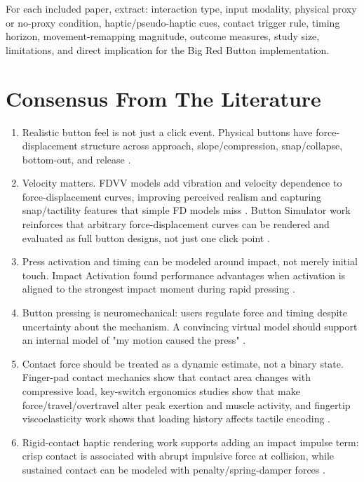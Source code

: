 \documentclass[11pt]{article}
\begin{document}
For each included paper, extract: interaction type, input modality, physical proxy or no-proxy condition, haptic/pseudo-haptic cues, contact trigger rule, timing horizon, movement-remapping magnitude, outcome measures, study size, limitations, and direct implication for the Big Red Button implementation.

\section{Consensus From The Literature}
\begin{enumerate}
  \item Realistic button feel is not just a click event. Physical buttons have force-displacement structure across approach, slope/compression, snap/collapse, bottom-out, and release \cite{kim2013virtualbutton,liao2020fdvv}.
  \item Velocity matters. FDVV models add vibration and velocity dependence to force-displacement curves, improving perceived realism and capturing snap/tactility features that simple FD models miss \cite{liao2020fdvv,liao2020pressem}. Button Simulator work reinforces that arbitrary force-displacement curves can be rendered and evaluated as full button designs, not just one click point \cite{liao2018buttonsim}.
  \item Press activation and timing can be modeled around impact, not merely initial touch. Impact Activation found performance advantages when activation is aligned to the strongest impact moment during rapid pressing \cite{kim2018impact}.
  \item Button pressing is neuromechanical: users regulate force and timing despite uncertainty about the mechanism. A convincing virtual model should support an internal model of "my motion caused the press" \cite{oulasvirta2018neuromechanics}.
  \item Contact force should be treated as a dynamic estimate, not a binary state. Finger-pad contact mechanics show that contact area changes with compressive load, key-switch ergonomics studies show that make force/travel/overtravel alter peak exertion and muscle activity, and fingertip viscoelasticity work shows that loading history affects tactile encoding \cite{dzidek2017fingerpad,radwin1997activation,rempel1997keyswitch,saal2025viscoelasticity}.
  \item Rigid-contact haptic rendering work supports adding an impact impulse term: crisp contact is associated with abrupt impulsive force at collision, while sustained contact can be modeled with penalty/spring-damper forces \cite{constantinescu2004impulsive}.

\end{enumerate}
\end{document}
